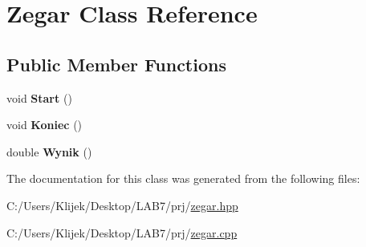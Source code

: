 \hypertarget{class_zegar}{\section{Zegar Class Reference}
\label{class_zegar}
}
\subsection*{Public Member Functions}
\begin{DoxyCompactItemize}
\item 
\hypertarget{class_zegar_af747dc3a9d58207618ec877990900b80}{void {\bfseries Start} ()}\label{class_zegar_af747dc3a9d58207618ec877990900b80}

\item 
\hypertarget{class_zegar_a8a88ddd1aa0768bfbe37217e32a01da0}{void {\bfseries Koniec} ()}\label{class_zegar_a8a88ddd1aa0768bfbe37217e32a01da0}

\item 
\hypertarget{class_zegar_a78715c1ac3a9b593c6fd5d1a17b79308}{double {\bfseries Wynik} ()}\label{class_zegar_a78715c1ac3a9b593c6fd5d1a17b79308}

\end{DoxyCompactItemize}


The documentation for this class was generated from the following files\-:\begin{DoxyCompactItemize}
\item 
C\-:/\-Users/\-Klijek/\-Desktop/\-L\-A\-B7/prj/\hyperlink{zegar_8hpp}{zegar.\-hpp}\item 
C\-:/\-Users/\-Klijek/\-Desktop/\-L\-A\-B7/prj/\hyperlink{zegar_8cpp}{zegar.\-cpp}\end{DoxyCompactItemize}
